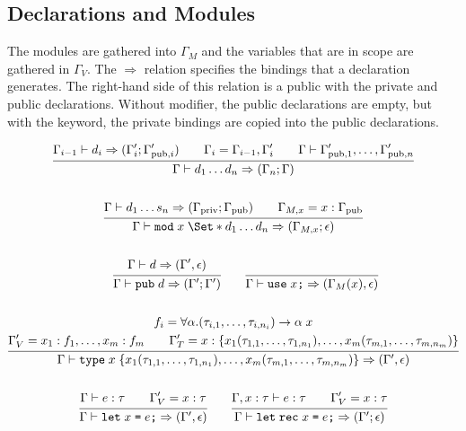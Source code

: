 \subsection{Declarations and Modules}

The modules are gathered into $\Gamma_M$ and the variables that are in scope are gathered in $\Gamma_V$. The $\Rightarrow$ relation specifies the bindings that a declaration generates. The right-hand side of this relation is a public with the private and public declarations. Without modifier, the public declarations are empty, but with the  keyword, the private bindings are copied into the public declarations.

\begin{gather*}
    \infer{
        \Gamma \vdash d_1 \dots d_n \Rightarrow (\Gamma_n; \Gamma)
    }{
        \Gamma_{i-1} \vdash d_i \Rightarrow (\Gamma'_i; \Gamma'_{\text{pub}, i})
        \qquad
        \Gamma_i = \Gamma_{i-1}, \Gamma'_i
        \qquad
        \Gamma \vdash \Gamma'_{\text{pub},1}, \dots, \Gamma'_{\text{pub},n}
    }
    \\\\
    \infer{
        \Gamma \vdash \kw{mod}\;x\;\S{ d_1 \dots d_n } \Rightarrow (\Gamma_{M,x}; \epsilon)
    }{
        \Gamma \vdash d_1 \dots s_n \Rightarrow (\Gamma_{\text{priv}};\Gamma_{\text{pub}})
        \qquad
        \Gamma_{M,x} = x : \Gamma_{\text{pub}}
    }
    \\\\
    \qquad
    \infer{
        \Gamma \vdash \kw{pub}\;d \Rightarrow (\Gamma'; \Gamma')
    }{
        \Gamma \vdash d \Rightarrow (\Gamma', \epsilon)
    }
    \qquad
    \infer{
        \Gamma \vdash \kw{use}\;x\tok{;} \Rightarrow (\Gamma_M(x), \epsilon)
    }{}
    \\\\
    \infer{
        \Gamma \vdash \type\;x \;
        \{ x_1(\tau_{1,1}, \dots, \tau_{1,n_1}), \dots, x_m(\tau_{m,1}, \dots, \tau_{m,n_m}) \} \Rightarrow (\Gamma', \epsilon)
    }{
        f_i = \forall \alpha. (\tau_{i,1}, \dots, \tau_{i,n_i}) \to \alpha\;x
        \\
        \Gamma'_V = x_1: f_1,\dots,x_m: f_m
        \qquad
        \Gamma'_T = x: \{x_1(\tau_{1,1}, \dots, \tau_{1,n_1}), \dots, x_m(\tau_{m,1}, \dots, \tau_{m,n_m})\}
    }
    \\\\
    \infer{
        \Gamma \vdash \kw{let}\;x\;\tok{=}\;e\tok{;} \Rightarrow (\Gamma', \epsilon)
    }{
        \Gamma \vdash e : \tau
        \qquad
        \Gamma'_V = x : \tau
    }
    \qquad
    \infer{
        \Gamma \vdash \kw{let}\;\kw{rec}\;x\;\tok{=}\;e\tok{;} \Rightarrow (\Gamma'; \epsilon)
    }{
        \Gamma, x: \tau \vdash e : \tau
        \qquad
        \Gamma'_V = x : \tau
    }
\end{gather*}

